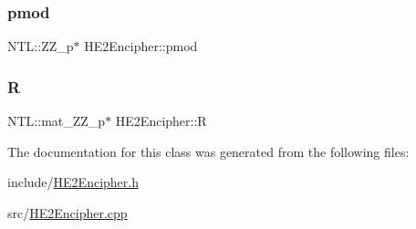 \subsubsection{\texorpdfstring{pmod}{pmod}}
{\footnotesize\ttfamily N\+T\+L\+::\+Z\+Z\+\_\+p$\ast$ H\+E2\+Encipher\+::pmod\hspace{0.3cm}{\ttfamily [protected]}}

\mbox{\label{classHE2Encipher_af01e9f2e19df354cecde3f7ea66524a0}} 
\subsubsection{\texorpdfstring{R}{R}}
{\footnotesize\ttfamily N\+T\+L\+::mat\+\_\+\+Z\+Z\+\_\+p$\ast$ H\+E2\+Encipher\+::R\hspace{0.3cm}{\ttfamily [protected]}}



The documentation for this class was generated from the following files\+:\begin{DoxyCompactItemize}
\item 
include/\hyperlink{HE2Encipher_8h}{H\+E2\+Encipher.\+h}\item 
src/\hyperlink{HE2Encipher_8cpp}{H\+E2\+Encipher.\+cpp}\end{DoxyCompactItemize}
